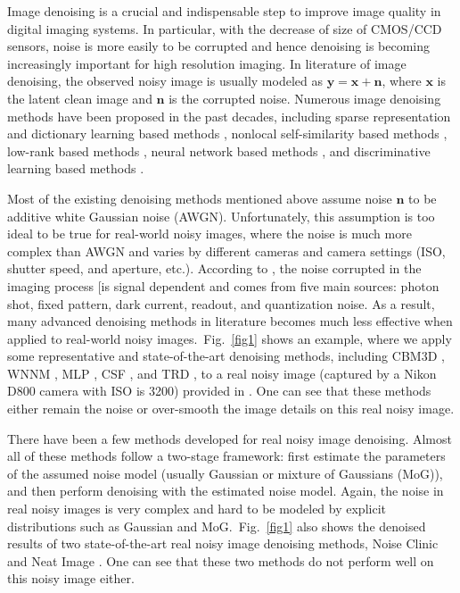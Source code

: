 \documentclass[10pt,twocolumn,letterpaper]{article}
\begin{document}
Image denoising is a crucial and indispensable step to improve image quality in digital imaging systems. In particular, with the decrease of size of CMOS/CCD sensors, noise is more easily to be corrupted and hence denoising is becoming increasingly important for high resolution imaging. In literature of image denoising, the observed noisy image is usually modeled as $\mathbf{y}=\mathbf{x}+\mathbf{n}$, where $\mathbf{x}$ is the latent clean image and $\mathbf{n}$ is the corrupted noise. Numerous image denoising methods \cite{ksvd,lssc,ncsr,nlm,bm3d,cbm3d,pgpd,wnnm,mlp,csf,chen2015learning,foe,epll} have been proposed in the past decades, including sparse representation and dictionary learning based methods \cite{ksvd,lssc,ncsr}, nonlocal self-similarity based methods \cite{nlm,bm3d,cbm3d,ncsr,pgpd}, low-rank based methods \cite{wnnm}, neural network based methods \cite{mlp}, and discriminative learning based methods \cite{csf,chen2015learning}. 

Most of the existing denoising methods \cite{ksvd,lssc,nlm,bm3d,cbm3d,ncsr,pgpd,wnnm,mlp,csf,chen2015learning,foe,epll} mentioned above assume noise $\mathbf{n}$ to be additive white Gaussian noise (AWGN). Unfortunately, this assumption is too ideal to be true for real-world noisy images, where the noise is much more complex than AWGN \cite{crosschannel2016,healey1994radiometric} and varies by different cameras and camera settings (ISO, shutter speed, and aperture, etc.). According to \cite{healey1994radiometric}, the noise corrupted in the imaging process [is signal dependent and comes from five main sources: photon shot, fixed pattern, dark current, readout, and quantization noise. As a result, many advanced denoising methods in literature becomes much less effective when applied to real-world noisy images.\ Fig.\ \ref{fig1} shows an example, where we apply some representative and state-of-the-art denoising methods, including CBM3D \cite{cbm3d}, WNNM \cite{wnnm}, MLP \cite{mlp}, CSF \cite{csf}, and TRD \cite{chen2015learning}, to a real noisy image (captured by a Nikon D800 camera with ISO is 3200) provided in \cite{crosschannel2016}. One can see that these methods either remain the noise or over-smooth the image details on this real noisy image. 

There have been a few methods \cite{Liu2008,almapg,Zhu_2016_CVPR,crosschannel2016,noiseclinic,ncwebsite,neatimage} developed for real noisy image denoising. Almost all of these methods follow a two-stage framework: first estimate the parameters of the assumed noise model (usually Gaussian  or mixture of Gaussians (MoG)), and then perform denoising with the estimated noise model. Again, the noise in real noisy images is very complex and hard to be modeled by explicit distributions such as Gaussian and MoG.\ Fig.\ \ref{fig1} also shows the denoised results of two state-of-the-art real noisy image denoising methods, Noise Clinic \cite{noiseclinic,ncwebsite} and Neat Image \cite{neatimage}. One can see that these two methods do not perform well on this noisy image either. 
\end{document}
